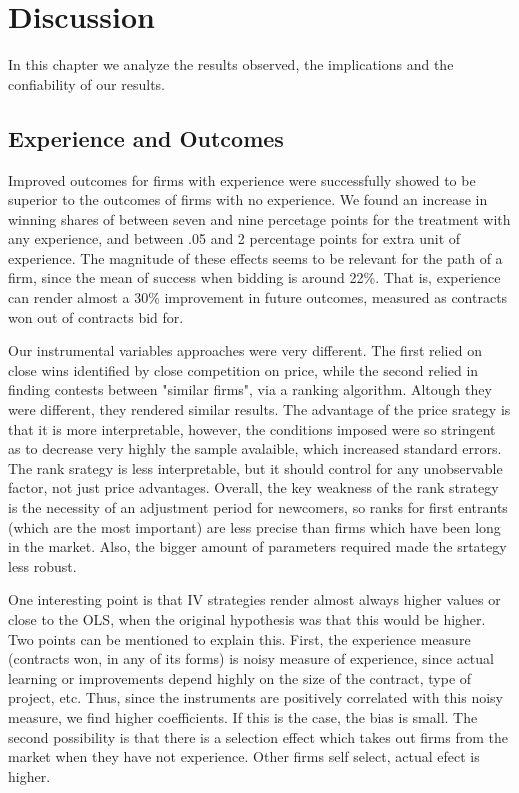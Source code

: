 \chapter{Discussion}

In this chapter we analyze the results observed, the implications and the confiability of our results.

\section{Experience and Outcomes}
Improved outcomes for firms with experience were successfully showed to be superior to the outcomes of firms with no experience. We found an increase in winning shares of between seven and nine percetage points for the treatment with any experience, and between .05 and 2 percentage points for extra unit of experience. The magnitude of these effects seems to be relevant for the path of a firm, since the mean of success when bidding is around 22\%. That is, experience can render almost a 30\% improvement in future outcomes, measured as contracts won out of contracts bid for.

Our instrumental variables approaches were very different. The first relied on close wins identified by close competition on price, while the second relied in finding contests between "similar firms", via a ranking algorithm. Altough they were different, they rendered similar results. The advantage of the price srategy is that it is more interpretable, however, the conditions imposed were so stringent as to decrease very highly the sample avalaible, which increased standard errors. The rank srategy is less interpretable, but it should control for any unobservable factor, not just price advantages. Overall, the key weakness of the rank strategy is the necessity of an adjustment period for newcomers, so ranks for first entrants (which are the most important) are less precise than firms which have been long in the market. Also, the bigger amount of parameters required made the srtategy less robust.

One interesting point is that IV strategies render almost always higher values or close to the OLS, when the original hypothesis was that this would be higher. Two points can be mentioned to explain this. First, the experience measure (contracts won, in any of its forms) is noisy measure of experience, since actual learning or improvements depend highly on the size of the contract, type of project, etc. Thus, since the instruments are positively correlated with this noisy measure, we find higher coefficients. If this is the case, the bias is small. The second possibility is that there is a selection effect which takes out firms from the market when they have not experience. Other firms self select, actual efect is higher.

